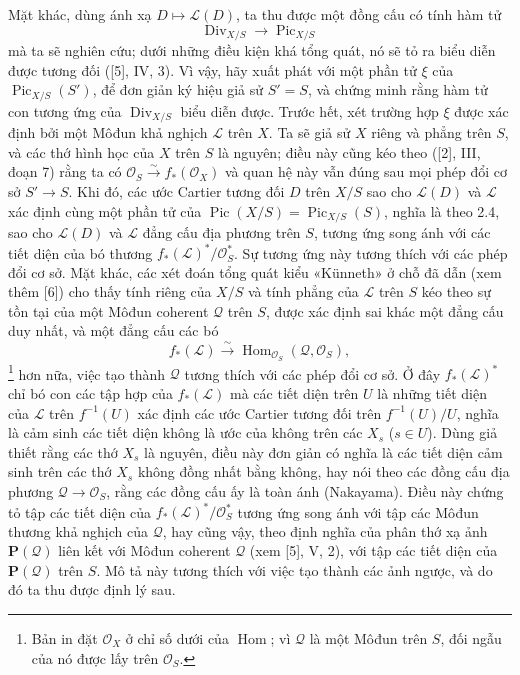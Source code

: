Mặt khác, dùng ánh xạ $D\longmapsto\mathcal L(D)$, ta thu được một đồng cấu có
tính hàm tử
\begin{equation}
\operatorname{Div}_{X/S}\longrightarrow\operatorname{Pic}_{X/S}
\tag{+}
\end{equation}
mà ta sẽ nghiên cứu; dưới những điều kiện khá tổng quát, nó sẽ tỏ ra biểu diễn
được tương đối ([5], IV, 3). Vì vậy, hãy xuất phát với một phần tử $\xi$ của
$\operatorname{Pic}_{X/S}(S')$, để đơn giản ký hiệu giả sử $S'=S$, và chứng
minh rằng hàm tử con tương ứng của $\operatorname{Div}_{X/S}$ biểu diễn được.
Trước hết, xét trường hợp $\xi$ được xác định bởi một Môđun khả nghịch
$\mathcal L$ trên $X$. Ta sẽ giả sử $X$ riêng và phẳng trên $S$, và các thớ
hình học của $X$ trên $S$ là nguyên; điều này cũng kéo theo ([2], III, đoạn 7)
rằng ta có $\mathcal O_S\xrightarrow{\sim}f_*(\mathcal O_X)$ và quan hệ này
vẫn đúng sau mọi phép đổi cơ sở $S'\longrightarrow S$. Khi đó, các ước Cartier
tương đối $D$ trên $X/S$ sao cho $\mathcal L(D)$ và $\mathcal L$ xác định cùng
một phần tử của $\operatorname{Pic}(X/S)=\operatorname{Pic}_{X/S}(S)$, nghĩa
là theo 2.4, sao cho $\mathcal L(D)$ và $\mathcal L$ đẳng cấu địa phương trên
$S$, tương ứng song ánh với các tiết diện của bó thương
$f_*(\mathcal L)^*/\mathcal O_S^*$. Sự tương ứng này tương thích với các phép
đổi cơ sở. Mặt khác, các xét đoán tổng quát kiểu «Künneth» ở chỗ đã dẫn (xem
thêm [6]) cho thấy tính riêng của $X/S$ và tính phẳng của $\mathcal L$ trên
$S$ kéo theo sự tồn tại của một Môđun coherent $\mathcal Q$ trên $S$, được
xác định sai khác một đẳng cấu duy nhất, và một đẳng cấu các bó
\[
f_*(\mathcal L)\xrightarrow{\sim}
\operatorname{Hom}_{\mathcal O_S}(\mathcal Q,\mathcal O_S),
\]
\footnote{Bản in đặt $\mathcal O_X$ ở chỉ số dưới của
$\operatorname{Hom}$; vì $\mathcal Q$ là một Môđun trên $S$, đối ngẫu của nó
được lấy trên $\mathcal O_S$.} hơn nữa, việc tạo thành $\mathcal Q$ tương
thích với các phép đổi cơ sở. Ở đây $f_*(\mathcal L)^*$ chỉ bó con các tập hợp
của $f_*(\mathcal L)$ mà các tiết diện trên $U$ là những tiết diện của
$\mathcal L$ trên $f^{-1}(U)$ xác định các ước Cartier tương đối trên
$f^{-1}(U)/U$, nghĩa là cảm sinh các tiết diện không là ước của không trên các
$X_s$ ($s\in U$). Dùng giả thiết rằng các thớ $X_s$ là nguyên, điều này đơn
giản có nghĩa là các tiết diện cảm sinh trên các thớ $X_s$ không đồng nhất
bằng không, hay nói theo các đồng cấu địa phương
$\mathcal Q\longrightarrow\mathcal O_S$, rằng các đồng cấu ấy là toàn ánh
(Nakayama). Điều này chứng tỏ tập các tiết diện của
$f_*(\mathcal L)^*/\mathcal O_S^*$ tương ứng song ánh với tập các Môđun thương
khả nghịch của $\mathcal Q$, hay cũng vậy, theo định nghĩa của phân thớ xạ ảnh
$\mathbf P(\mathcal Q)$ liên kết với Môđun coherent $\mathcal Q$ (xem [5], V,
2), với tập các tiết diện của $\mathbf P(\mathcal Q)$ trên $S$. Mô tả này
tương thích với việc tạo thành các ảnh ngược, và do đó ta thu được định lý sau.

